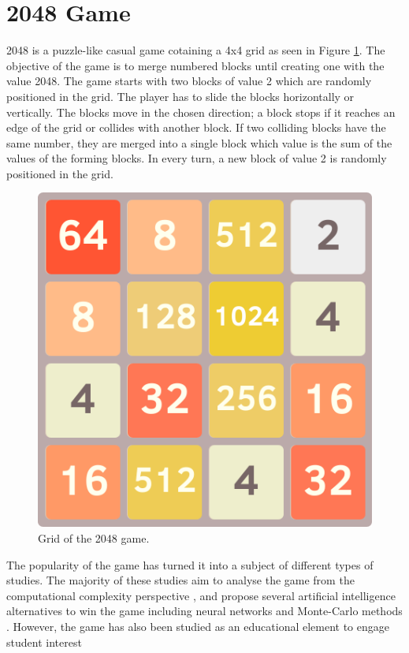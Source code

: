 \section{2048 Game}
2048 is a puzzle-like casual game cotaining a 4x4 grid as seen in Figure \ref{fig:2048-grid}. The objective of the game is to merge numbered blocks until creating one with the value 2048. The game starts with two blocks of value 2 which are randomly positioned in the grid. The player has to slide the blocks horizontally or vertically. The blocks move in the chosen direction; a block stops if it reaches an edge of the grid or collides with another block. If two colliding blocks have the same number, they are merged into a single block which value is the sum of the values of the forming blocks. In every turn, a new block of value 2 is randomly positioned in the grid.

\begin{figure}[htb]
    \vskip 5mm
        \begin{center}
            \includegraphics[scale=0.5]{./Figures/game_grid.png}
            \caption{Grid of the 2048 game.}
            \label{fig:2048-grid}
        \end{center}
    \vskip -5mm
\end{figure}

The popularity of the game has turned it into a subject of different types of studies. The majority of these studies aim to analyse the game from the computational complexity perspective \citep{abdelkader20162048}, and propose several artificial intelligence alternatives to win the game including neural networks \citep{boris2016evolving} and Monte-Carlo methods \citep{rodgers2014investigation}. However, the game has also been studied as an educational element to engage student interest \citep{neller2015pedagogical}

